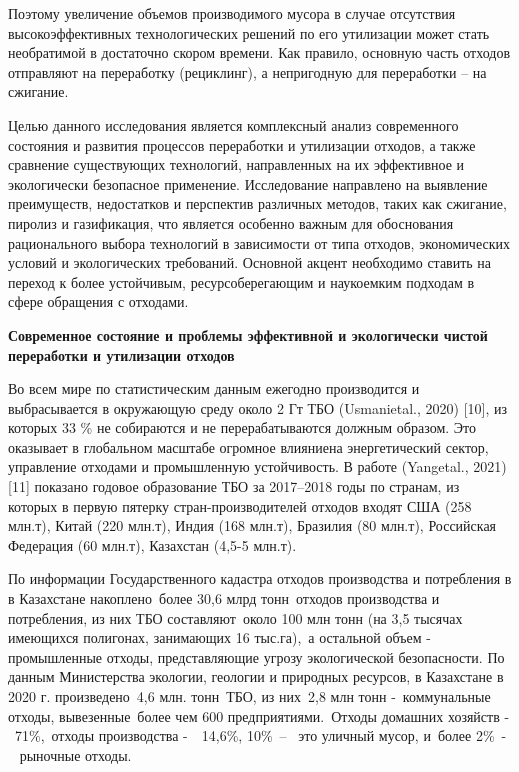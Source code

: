 \begin{multicols}{2}
Поэтому увеличение объемов производимого мусора в случае отсутствия
высокоэффективных технологических решений по его утилизации может стать
необратимой в достаточно скором времени. Как правило, основную часть
отходов отправляют на переработку (рециклинг), а непригодную для
переработки -- на сжигание.

Целью данного исследования является комплексный анализ современного
состояния и развития процессов переработки и утилизации отходов, а также
сравнение существующих технологий, направленных на их эффективное и
экологически безопасное применение. Исследование направлено на выявление
преимуществ, недостатков и перспектив различных методов, таких как
сжигание, пиролиз и газификация, что является особенно важным для
обоснования рационального выбора технологий в зависимости от типа
отходов, экономических условий и экологических требований. Основной
акцент необходимо ставить на переход к более устойчивым,
ресурсоберегающим и наукоемким подходам в сфере обращения с отходами.

{\bfseries Современное состояние и проблемы эффективной и экологически
чистой переработки и утилизации отходов}

Во всем мире по статистическим данным ежегодно производится и
выбрасывается в окружающую среду около 2 Гт ТБО (Usmanietal., 2020)
{[}10{]}, из которых 33 \% не собираются и не перерабатываются должным
образом. Это оказывает в глобальном масштабе огромное влияниена
энергетический сектор, управление отходами и промышленную устойчивость.
В работе (Yangetal., 2021) {[}11{]} показано годовое образование ТБО за
2017--2018 годы по странам, из которых в первую пятерку
стран-производителей отходов входят США (258 млн.т), Китай (220 млн.т),
Индия (168 млн.т), Бразилия (80 млн.т), Российская Федерация (60 млн.т),
Казахстан (4,5-5 млн.т).

По информации Государственного кадастра отходов производства и
потребления в в Казахстане накоплено~более 30,6 млрд
тонн~отходов производства и потребления, из них ТБО
составляют~около 100 млн тонн (на 3,5 тысячах имеющихся полигонах,
занимающих 16 тыс.га),~а остальной объем - промышленные отходы,
представляющие угрозу экологической безопасности. По данным Министерства
экологии, геологии и природных ресурсов, в Казахстане в 2020 г.
произведено~4,6 млн. тонн~ТБО, из них~2,8 млн тонн
-~коммунальные отходы, вывезенные~более чем 600
предприятиями.~Отходы домашних хозяйств -~71\%,~отходы
производства -~~14,6\%, 10\%~--~ это уличный мусор,
и~более 2\%~-~ рыночные отходы.


\end{multicols}

